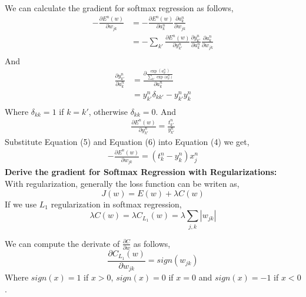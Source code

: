 \documentclass{article} %
\begin{document}
We can calculate the gradient for softmax regression as follows,
\begin{equation}
\begin{split}
-\frac{\partial E^n(w)}{\partial w_{jk}}& = - \frac{\partial E^n(w)}{\partial a_k^n}\frac{\partial a_k^n}{\partial w_{jk}} \\
& = -\sum_{k'} \frac{\partial E^n(w)}{\partial y^n_{k'}} \frac{\partial y^n_{k'}}{\partial a^n_k}\frac{\partial a_k^n}{\partial w_{jk}} \\
\end{split}
\end{equation}
And 
\begin{equation}
\begin{split}
\frac{\partial y^n_{k'}}{\partial a^n_k} &=
\frac{\partial \frac{\exp{(a^n_{k'})}}{ \sum_{k'}\exp{(a_{k'}^n})}}{\partial a^n_k} \\
& = y^n_{k'}\delta_{kk'} - y^n_{k
'}y^n_{k}\\
\end{split}
\end{equation}
Where $\delta_{kk} = 1$ if $k = k'$, otherwise $\delta_{kk} = 0$.
And
\begin{equation}
\begin{split}
	\frac{\partial E^n(w)}{\partial y^n_{k'}} = \frac{t^n_{k'}}{y^n_{k'}}
\end{split}
\end{equation}
Substitute Equation (5) and Equation (6) into Equation (4) we get,
\begin{equation}
\begin{split}
	-\frac{\partial E^n(w)}{\partial w_{jk}} = (t^n_k - y^n_k)x_j^n 
\end{split}
\end{equation}
\textbf{Derive the gradient for Softmax Regression with Regularizations:} \\

With regularization, generally the loss function can be writen as,
\begin{equation}
J(w) = E(w) + \lambda C(w)
\end{equation}
If we use $L_1$ regularization in softmax regression,
\begin{equation}
	\lambda C(w) = \lambda C_{L_1}(w) =   \lambda \sum_{j,k}|w_{jk}|
\end{equation}

We can compute the derivate of $\frac{\partial C}{\partial w}$ as follows,
\begin{equation}
	\frac{\partial C_{L_1}(w)}{\partial w_{jk}} = sign(w_{jk})
\end{equation}
Where $sign(x) = 1$ if $x > 0$, $sign(x) = 0$ if $x = 0$ and $sign(x) = -1$ if $x < 0$.
\end{document}
